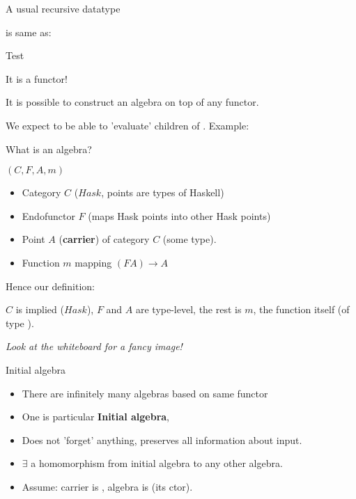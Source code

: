 \documentclass{beamer}
\newcommand{\hin}[2]{}
\begin{document}
\begin{frame}[fragile]{A usual recursive datatype}
\hin{9}{11}

is same as:
\hin{16}{20}
\end{frame}


\begin{frame}[fragile]{Test}
\hin{23}{24}
\end{frame}

 
\begin{frame}[fragile]{It is a functor!}

\hin{29}{32}

It is possible to construct an algebra on top of any functor.

\hin{55}{55}

We expect to be able to 'evaluate' children of .
Example:

\hin{37}{40}

\end{frame}




\begin{frame}[fragile]{What is an algebra?}

$(C, F, A, m)$
\begin{itemize}
\item Category $C$ ($Hask$, points are types of Haskell)
\item Endofunctor $F$ (maps Hask points into other Hask points)
\item Point $A$ (\textbf{carrier}) of category $C$ (some type).
\item Function $m$ mapping $(F A) \rightarrow A$
\end{itemize}
 
Hence our definition:

\hin{55}{55}

$C$ is implied ($Hask$), $F$ and $A$ are type-level, the rest is $m$, the function itself (of type ).

\textit{Look at the whiteboard for a fancy image!}

\end{frame}


\begin{frame}[fragile]{Initial algebra}
\begin{itemize}
\item There are infinitely many algebras based on same functor

\item One is particular \textbf{Initial algebra}, 

\item Does not 'forget' anything, preserves all information about input.

\item $\exists$ a homomorphism from initial algebra to any other algebra.

\item Assume: carrier is , algebra is  (its ctor).

\hin{55}{55}
\hin{63}{65}

\end{itemize}

\end{frame}
\end{document}
